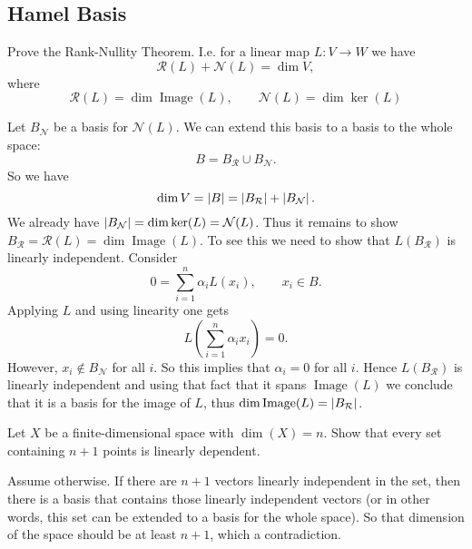 \subsection{Hamel Basis}

\begin{problem}
	Prove the Rank-Nullity Theorem. I.e. for a linear map $ L: V\to W $ we have
	\[ \mathcal{R}(L) + \mathcal{N}(L) = \dim V, \]
	where
	\[ \mathcal{R}(L) = \dim\operatorname{Image}(L),\qquad \mathcal{N}(L) = \dim\ker(L) \]
\end{problem}
\begin{solution}
	Let $ B_\mathcal{N} $ be a basis for $ \mathcal{N}(L) $. We can extend this basis to a basis to the whole space:
	\[ B = B_\mathcal{R} \cup B_\mathcal{N}. \]
	So we have
	\[  \dim V = \left|B\right| = \left|B_\mathcal{R}\right| + \left|B_\mathcal{N}\right|. \]
	We already have $ \left|B_\mathcal{N}\right| = \dim \ker(L) = \mathcal{N}(L) $. Thus it remains to show $ B_\mathcal{R} = \mathcal{R}(L) = \dim\operatorname{Image}(L) $. To see this we need to show that $ L(B_\mathcal{R}) $ is linearly independent. Consider
	\[ 0 = \sum_{i=1}^{n}\alpha_i L(x_i), \qquad x_i \in B. \]
	Applying $ L $ and using linearity one gets
	\[ L(\sum_{i=1}^{n}\alpha_i x_i) = 0. \]
	However, $ x_i\notin B_\mathcal{N} $ for all $ i $. So this implies that $ \alpha_i = 0 $ for all $ i $. Hence $ L(B_\mathcal{R}) $ is linearly independent and using that fact that it spans $ \operatorname{Image}(L) $ we conclude that it is a basis for the image of $ L $, thus $ \dim\operatorname{Image}(L) = \left|B_\mathcal{R}\right| $.
\end{solution}


\begin{problem}
	Let $ X $ be a finite-dimensional space with $ \dim(X) = n $. Show that every set containing $ n+1 $ points is linearly dependent.
\end{problem}
\begin{solution}
	Assume otherwise. If there are $ n+1 $ vectors linearly independent in the set, then there is a basis that contains those linearly independent vectors (or in other words, this set can be extended to a basis for the whole space). So that dimension of the space should be at least $ n+1 $, which a contradiction.
\end{solution}



